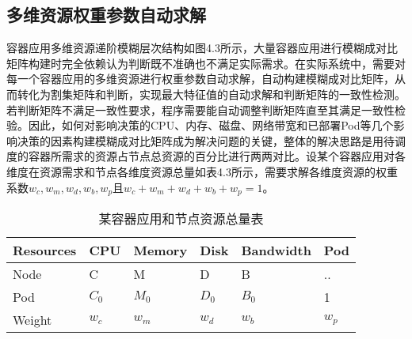 \subsection{多维资源权重参数自动求解}
容器应用多维资源递阶模糊层次结构如图4.3所示，大量容器应用进行模糊成对比矩阵构建时完全依赖认为判断既不准确也不满足实际需求。在实际系统中，需要对每一个容器应用的多维资源进行权重参数自动求解，自动构建模糊成对比矩阵，从而转化为割集矩阵和判断，实现最大特征值的自动求解和判断矩阵的一致性检测。若判断矩阵不满足一致性要求，程序需要能自动调整判断矩阵直至其满足一致性检验。因此，如何对影响决策的CPU、内存、磁盘、网络带宽和已部署Pod等几个影响决策的因素构建模糊成对比矩阵成为解决问题的关键，整体的解决思路是用待调度的容器所需求的资源占节点总资源的百分比进行两两对比。设某个容器应用对各维度在资源需求和节点各维度资源总量如表4.3所示，需要求解各维度资源的权重系数$w_{c},w_{m},w_{d},w_{b},w_{p}$且$w_{c}+w_{m}+w_{d}+w_{b}+w_{p}=1$。
\begin{table}[htbp]
	\centering\dawu[1.3]
	\caption{某容器应用和节点资源总量表}
		\begin{tabular}{|p{1.5cm}<{\centering}|p{1.5cm}<{\centering}|p{1.5cm}<{\centering}|p{1.5cm}<{\centering}|p{1.8cm}<{\centering}|p{1.5cm}<{\centering}|} \hline
			Resources & CPU & Memory & Disk & Bandwidth & Pod \\ \hline
			Node & C & M & D & B & ..  \\ \hline
			Pod & $C_{0}$ & $M_{0}$ & $D_{0}$ & $B_{0}$ & 1  \\ \hline
			Weight & $w_{c}$ & $w_{m}$ & $w_{d}$ & $w_{b}$ & $w_{p}$ \\ \hline
		\end{tabular}
\end{table}

